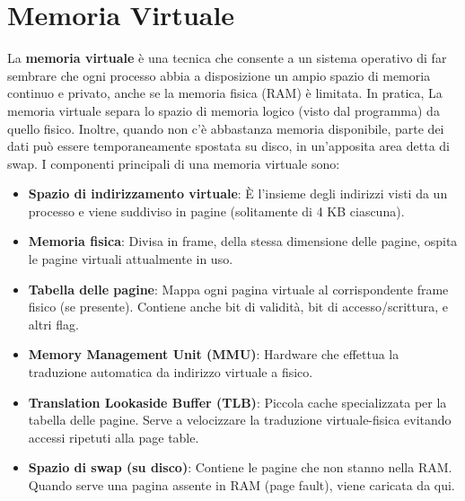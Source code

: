 \section{Memoria Virtuale}
La \textbf{memoria virtuale} è una tecnica che consente a un sistema operativo di far sembrare che ogni processo abbia a disposizione un ampio spazio di memoria continuo e privato, anche se la memoria fisica (RAM) è limitata. In pratica, La memoria virtuale separa lo spazio di memoria logico (visto dal programma) da quello fisico. Inoltre, quando non c'è abbastanza memoria disponibile, parte dei dati può essere temporaneamente spostata su disco, in un'apposita area detta di swap. I componenti principali di una memoria virtuale sono:
\begin{itemize}
    \item \textbf{Spazio di indirizzamento virtuale}: \MakeUppercase{è} l'insieme degli indirizzi visti da un processo e viene suddiviso in pagine (solitamente di 4 KB ciascuna).
    \item \textbf{Memoria fisica}: Divisa in frame, della stessa dimensione delle pagine, ospita le pagine virtuali attualmente in uso.
    \item \textbf{Tabella delle pagine}: Mappa ogni pagina virtuale al corrispondente frame fisico (se presente). Contiene anche bit di validità, bit di accesso/scrittura, e altri flag.
    \item \textbf{Memory Management Unit (MMU)}: Hardware che effettua la traduzione automatica da indirizzo virtuale a fisico.
    \item \textbf{Translation Lookaside Buffer (TLB)}: Piccola cache specializzata per la tabella delle pagine. Serve a velocizzare la traduzione virtuale-fisica evitando accessi ripetuti alla page table.
    \item \textbf{Spazio di swap (su disco)}: Contiene le pagine che non stanno nella RAM. Quando serve una pagina assente in RAM (page fault), viene caricata da qui.
\end{itemize}

